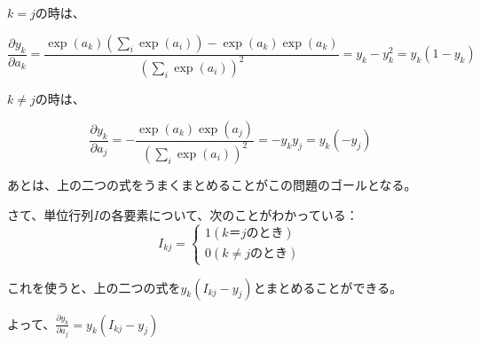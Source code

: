 $k = j$の時は、

\begin{equation*}
	\frac{\partial  y_k}{\partial a_k} = \frac{\exp(a_k) (\sum_i \exp(a_i)) - \exp (a_k) \exp(a_k) }{(\sum_i \exp(a_i))^2} = y_k - y_k^2 = y_k(1 - y_k)
\end{equation*}

$k \neq j$の時は、

\begin{equation*}
	\frac{\partial y_k}{\partial a_j} = -\frac{\exp(a_k) \exp(a_j) }{(\sum_i \exp(a_i))^2} =  -y_k y_j = y_k(-y_j)
\end{equation*}

あとは、上の二つの式をうまくまとめることがこの問題のゴールとなる。

さて、単位行列$I$の各要素について、次のことがわかっている：
\begin{equation*}
I_{kj} =  \left \{
\begin{array}{l}
1　(k＝jのとき) \\
0　(k≠jのとき)
\end{array}
\right.	
\end{equation*}

これを使うと、上の二つの式を$y_k (I_{kj} - y_j)$とまとめることができる。

よって、$\frac{\partial y_k}{\partial a_j} = y_k (I_{kj} - y_j)$









